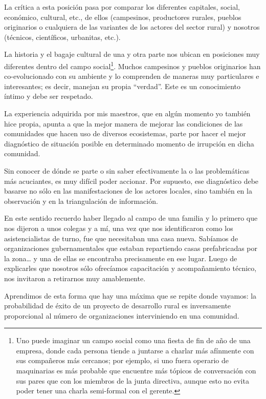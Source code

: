\begin{fullwidth}
La crítica a esta posición pasa por comparar los diferentes capitales,
social, económico, cultural, etc., de ellos (campesinos, productores
rurales, pueblos originarios o cualquiera de las variantes de los
actores del sector rural) y nosotros (técnicos, científicos, urbanitas,
etc.).

La historia y el bagaje cultural de una y otra parte nos ubican en
posiciones muy diferentes dentro del campo social\footnote{Uno puede
  imaginar un campo social como una fiesta de fin de año de una empresa,
  donde cada persona tiende a juntarse a charlar más afínmente con sus
  compañeros más cercanos; por ejemplo, si uno fuera operario de
  maquinarias es más probable que encuentre más tópicos de conversación
  con sus pares que con los miembros de la junta directiva, aunque esto
  no evita poder tener una charla semi-formal con el gerente.}. Muchos
campesinos y pueblos originarios han co-evolucionado con su ambiente y
lo comprenden de maneras muy particulares e interesantes; es decir,
manejan su propia ``verdad''. Este es un conocimiento íntimo y debe ser
respetado.

La experiencia adquirida por mis maestros, que en algún momento yo
también hice propia, apunta a que la mejor manera de mejorar las
condiciones de las comunidades que hacen uso de diversos ecosistemas,
parte por hacer el mejor diagnóstico de situación posible en determinado
momento de irrupción en dicha comunidad.

Sin conocer de dónde se parte o sin saber efectivamente la o las
problemáticas más acuciantes, es muy difícil poder accionar. Por
supuesto, ese diagnóstico debe basarse no sólo en las manifestaciones de
los actores locales, sino también en la observación y en la
triangulación de información.

En este sentido recuerdo haber llegado al campo de una familia y lo
primero que nos dijeron a unos colegas y a mí, una vez que nos
identificaron como los asistencialistas de turno, fue que necesitaban
una casa nueva. Sabíamos de organizaciones gubernamentales que estaban
repartiendo casas prefabricadas por la zona\ldots{} y una de ellas se
encontraba precisamente en ese lugar. Luego de explicarles que nosotros
sólo ofrecíamos capacitación y acompañamiento técnico, nos invitaron a
retirarnos muy amablemente.

Aprendimos de esta forma que hay una máxima que se repite donde vayamos:
la probabilidad de éxito de un proyecto de desarrollo rural es
inversamente proporcional al número de organizaciones interviniendo en
una comunidad.


\end{fullwidth}
